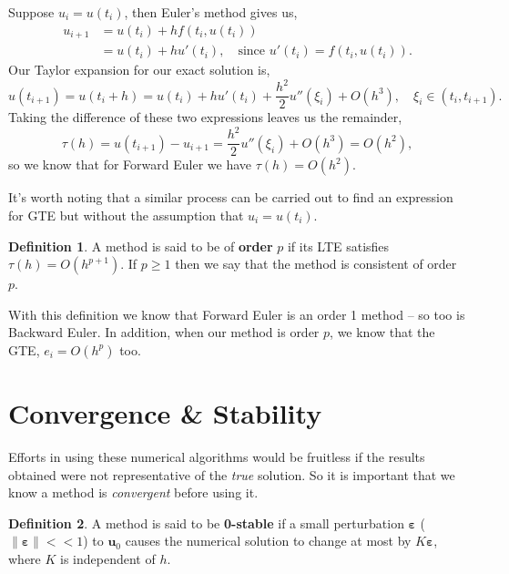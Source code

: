 \documentclass[12pt, twoside]{report}
\theoremstyle{plain}
\theoremstyle{definition}
\newtheorem{definition}{Definition}[chapter]
\theoremstyle{definition}
\providecommand{\norm}[1]{\lVert#1\rVert}
\begin{document}
        Suppose $u_i = u(t_i)$, then Euler's method gives us, 
        \begin{equation}
            \begin{split}
                u_{i+1} &= u(t_i) + hf(t_i, u(t_i)) \\
                &= u(t_i) + hu'(t_i),\quad
                \text{since } u'(t_i) = f(t_i, u(t_i)).
            \end{split}
        \end{equation}
        Our Taylor expansion for our exact solution is,
        \begin{equation}
            u(t_{i+1}) = u(t_i + h) = u(t_i) + hu'(t_i) + \frac{h^2}{2} 
            u''(\xi_i) + O(h^3), \quad \xi_i \in (t_i, t_{i+1}).
        \end{equation}
        Taking the difference of these two expressions leaves us the remainder,
        \begin{equation}
            \tau(h) = u(t_{i+1}) - u_{i+1} = \frac{h^2}{2} u''(\xi_i) + 
            O(h^3) = O(h^2),
        \end{equation}
        so we know that for Forward Euler we have $\tau(h)=O(h^2)$.

        It's worth noting that a similar process can be carried out to find an expression for GTE but without the assumption that 
        $u_i=u(t_i)$. 
        \begin{definition}
            A method is said to be of \textbf{order} $p$ if its LTE satisfies 
            $\tau(h)=O(h^{p+1})$. If $p \ge 1$ then we say that the method is
            consistent of order $p$.
        \end{definition}
        With this definition we know that Forward Euler is an order 1 method 
        -- so too is Backward Euler. In addition, when our method is order $p$,
        we know that the GTE, $e_i=O(h^p)$ too.


    \section{Convergence \& Stability}
    \label{2_stability}
        Efforts in using these numerical algorithms would be fruitless if the 
        results obtained were not representative of the \textit{true} solution.
        So it is important that we know a method is \textit{convergent} before 
        using it.

        \begin{definition}
            A method is said to be \textbf{0-stable} if a small perturbation 
            $\boldsymbol{\varepsilon}$ ($\norm{\boldsymbol{\varepsilon}} 
            << 1$) to $\mathbf{u}_0$ causes the numerical solution to change 
            at most by $K\boldsymbol{\varepsilon}$, where $K$ is independent 
            of $h$.
        \end{definition}
\end{document}
